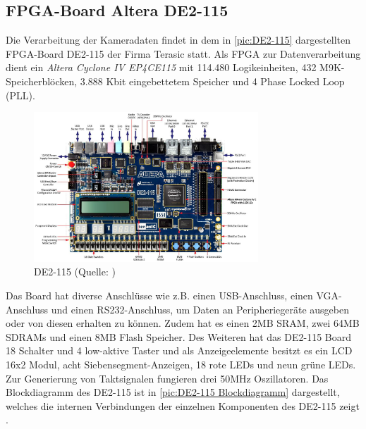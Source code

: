 \documentclass[ngerman,12pt]{article} %
\begin{document}
{\subsection{FPGA-Board Altera DE2-115}
\label{sec:FPGA-Board Altera DE2-115}
Die Verarbeitung der Kameradaten findet in dem in \autoref{pic:DE2-115} dargestellten FPGA-Board DE2-115 der Firma Terasic statt. Als FPGA zur Datenverarbeitung dient ein \textit{Altera Cyclone IV EP4CE115} mit 114.480 Logikeinheiten, 432 M9K-Speicherblöcken, 3.888 Kbit eingebettetem Speicher und 4 Phase Locked Loop (PLL).\newline

\begin{figure} [h!tb]%
	\begin{center}
	\includegraphics[width=0.75\textwidth]{DE2-115}
	\caption[FPGA-Board Altera DE2-115]{\label{pic:DE2-115}DE2-115  (Quelle: \cite{Terasic b})}
	\end{center}
\end{figure}

Das Board hat diverse Anschlüsse wie z.B. einen USB-Anschluss, einen VGA-Anschluss und einen RS232-Anschluss, um Daten an Peripheriegeräte ausgeben oder von diesen erhalten zu können. Zudem hat es einen 2MB SRAM, zwei 64MB SDRAMs und einen 8MB Flash Speicher. Des Weiteren hat das DE2-115 Board 18 Schalter und 4 low-aktive Taster und als Anzeigeelemente besitzt es ein LCD 16x2 Modul, acht Siebensegment-Anzeigen, 18 rote LEDs und neun grüne LEDs. Zur Generierung von Taktsignalen fungieren drei 50MHz Oszillatoren. Das Blockdiagramm des DE2-115 ist in \autoref{pic:DE2-115 Blockdiagramm} dargestellt, welches die internen Verbindungen der einzelnen Komponenten des DE2-115 zeigt \cite{Terasic b}.%

}
\end{document}
